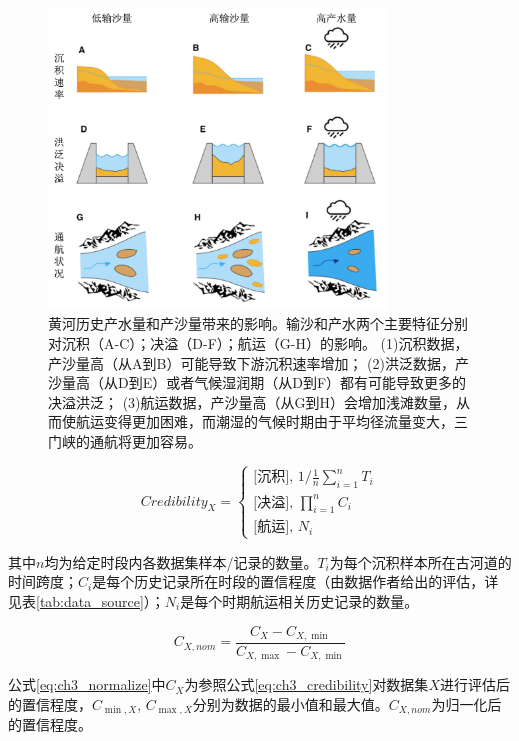\begin{figure}[!ht] %
    \centering
    \includegraphics[width=0.8\textwidth]{img/ch3/ch3_impacts_diagram.png}
    \caption[黄河历史产水量和产沙量变化的影响]{黄河历史产水量和产沙量带来的影响。输沙和产水两个主要特征分别对沉积（A-C）；决溢（D-F）；航运（G-H）的影响。
    (1)沉积数据，产沙量高（从A到B）可能导致下游沉积速率增加\cite{xu2003,yeqingchao1994}；
    (2)洪泛数据，产沙量高（从D到E）或者气候湿润期（从D到F）都有可能导致更多的决溢洪泛\cite{chen2012}；
    (3)航运数据，产沙量高（从G到H）会增加浅滩数量，从而使航运变得更加困难，而潮湿的气候时期由于平均径流量变大，三门峡的通航将更加容易\cite{WangShouChun1993}。}\label{fig:ch3:impacts_diagram}
\end{figure}



\begin{equation}
    \label{eq:ch3_credibility}
    Credibility_X = 
    \left\{\begin{array}{l}
        \text{[沉积], } 1 / \frac{1}{n} \sum_{i=1}^n T_i\\
        \text{[决溢], } \prod_{i=1}^n C_i\\
        \text{[航运], } N_i
    \end{array}\right.
\end{equation}    

其中$n$均为给定时段内各数据集样本/记录的数量。$T_i$为每个沉积样本所在古河道的时间跨度；$C_i$是每个历史记录所在时段的置信程度（由数据作者给出的评估，详见表\ref{tab:data_source}）；$N_i$是每个时期航运相关历史记录的数量。

\begin{equation}
    \label{eq:ch3_normalize}
    C_{X, nom}=\frac{C_X-C_{X, \min}}{C_{X, \max}-C_{X, \min}}
\end{equation}

公式\ref{eq:ch3_normalize}中$C_{X}$为参照公式\ref{eq:ch3_credibility}对数据集$X$进行评估后的置信程度，$C_{\min, X}$, $C_{\max, X}$分别为数据的最小值和最大值。$C_{X, nom}$为归一化后的置信程度。
